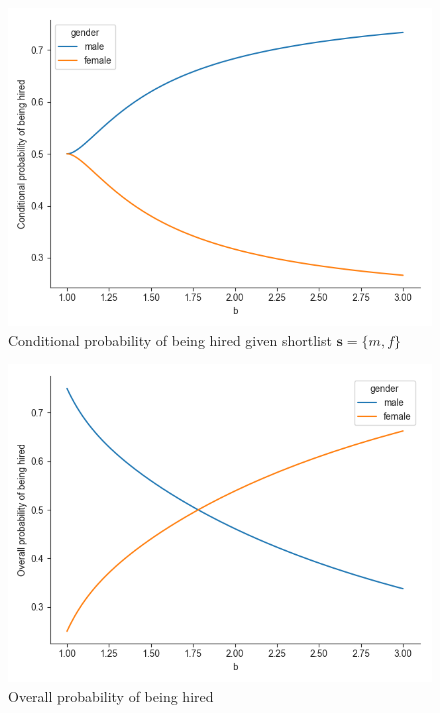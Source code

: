 \documentclass[11pt]{article}
\begin{document}
\begin{figure}[H] %
    \centering
    \caption{Conditional probability of being hired given shortlist $\bm{s} = \{m,f\}$}
    \includegraphics[width=\textwidth, keepaspectratio]{plots/conditional_prob_hire.png}
\end{figure}


\begin{figure}[H] %
    \centering
    \caption{Overall probability of being hired}
    \includegraphics[width=\textwidth, keepaspectratio]{plots/overall_prob_hire.png}
\end{figure}
\end{document}
